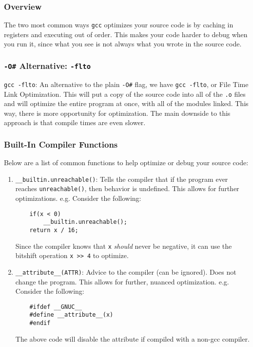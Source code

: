 \documentclass[13pt]{article}
\begin{document}
\subsubsection{Overview}
The two most common ways \texttt{gcc} optimizes your source code is by caching in registers and executing out of order. This makes your code harder to debug when you run it, since what you see is not always what you wrote in the source code.

\subsubsection{\texttt{-O\#} Alternative: \texttt{-flto}}
\texttt{gcc -flto}: An alternative to the plain \texttt{-O\#} flag, we have \texttt{gcc -flto}, or File Time Link Optimization. This will put a copy of the source code into all of the \texttt{.o} files and will optimize the entire program at once, with all of the modules linked. This way, there is more opportunity for optimization. The main downside to this approach is that compile times are even slower.

\subsubsection{Built-In Compiler Functions}
Below are a list of common functions to help optimize or debug your source code:
\begin{enumerate}[label=(\alph*)]
\item \texttt{\_\_builtin.unreachable()}: Tells the compiler that if the program ever reaches \texttt{unreachable()}, then behavior is undefined. This allows for further optimizations. e.g. Consider the following:
\begin{verbatim}
    if(x < 0)
        __builtin.unreachable();
    return x / 16;
\end{verbatim}
  Since the compiler knows that \texttt{x} \textit{should} never be negative, it can use the bitshift operation \texttt{x >> 4} to optimize.

\item \texttt{\_\_attribute\_\_(ATTR)}: Advice to the compiler (can be ignored). Does not change the program. This allows for further, nuanced optimization. e.g. Consider the following:
\begin{verbatim}
    #ifdef __GNUC__
    #define __attribute__(x)
    #endif
\end{verbatim}
  The above code will disable the attribute if compiled with a non-gcc compiler.
\end{enumerate}
\end{document}

